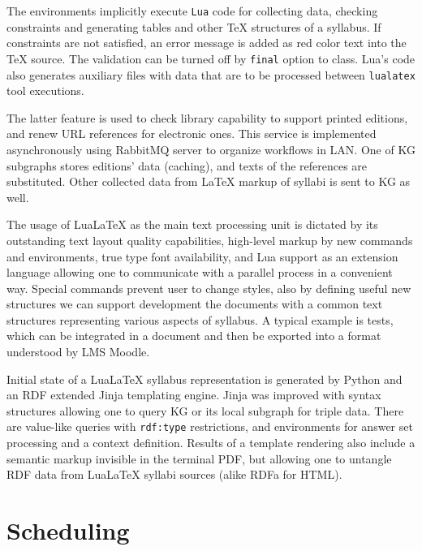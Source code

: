 \documentclass[
]{aiitart}
\providecommand{\LuaLaTeX}{Lua\LaTeX}
\begin{document}
The environments implicitly execute \verb|Lua| code for collecting data, checking constraints and generating tables and other \TeX{} structures of a syllabus.  If constraints are not satisfied, an error message is added as red color text into the \TeX{} source.   The validation can be turned off by \verb|final| option to class.
Lua's code also generates auxiliary files with data that are to be processed between \verb|lualatex| tool executions.

The latter feature is used to check library capability to support printed editions, and renew URL references for electronic ones.  This service is implemented asynchronously using RabbitMQ server to organize workflows in LAN.  One of KG subgraphs stores editions' data (caching), and texts of the references are substituted.  Other collected data from \LaTeX{} markup of syllabi is sent to KG as well.

The usage of \LuaLaTeX{} as the main text processing unit is dictated by its outstanding text layout quality capabilities, high-level markup by new commands and environments, true type font availability, and Lua support as an extension language allowing one to communicate with a parallel process in a convenient way.  Special commands prevent user to change styles, also by defining useful new structures we can support development the documents with a common text structures representing various aspects of syllabus.  A typical example is tests, which can be integrated in a document and then be exported into a format understood by LMS Moodle.

Initial state of a \LuaLaTeX{} syllabus representation is generated by Python and an RDF extended Jinja templating engine.  Jinja was improved with syntax structures allowing one to query KG or its local subgraph for triple data.  There are value-like queries with \verb|rdf:type| restrictions, and environments for answer set processing and a context definition.  Results of a template rendering also include a semantic markup invisible in the terminal PDF, but allowing one to untangle RDF data from \LuaLaTeX{} syllabi sources (alike RDFa for HTML).

\section{Scheduling}
\end{document}
